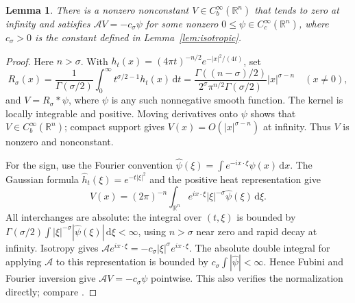 \documentclass[11pt]{article}
\newcommand{\R}{\mathbb R}
\newcommand{\dd}{\,\mathrm d}
\newcommand{\A}{\mathcal A}
\newcommand{\Cb}{C_b^\infty(\R^n)}
\newtheorem{lemma}[theorem]{Lemma}
\theoremstyle{remark}
\numberwithin{equation}{section}
\begin{document}
\begin{lemma}\label{lem:potential}
There is a nonzero nonconstant $V\in\Cb$ that tends to zero at infinity
and satisfies $\A V=-c_\sigma\psi$ for some nonzero
$0\le\psi\in C_c^\infty(\R^n)$, where $c_\sigma>0$ is the constant
defined in Lemma~\ref{lem:isotropic}.
\end{lemma}
\begin{proof}
Here $n>\sigma$. With $h_t(x)=(4\pi t)^{-n/2}e^{-|x|^2/(4t)}$, set
\[
 R_\sigma(x)=\frac1{\Gamma(\sigma/2)}\int_0^\infty
                 t^{\sigma/2-1}h_t(x)\dd t
 =\frac{\Gamma((n-\sigma)/2)}{2^\sigma\pi^{n/2}\Gamma(\sigma/2)}
                 |x|^{\sigma-n}\quad(x\ne0),
\]
and $V=R_\sigma*\psi$, where $\psi$ is any such nonnegative smooth function.
The kernel is locally integrable and positive. Moving derivatives onto
$\psi$ shows that $V\in\Cb$; compact support gives
$V(x)=O(|x|^{\sigma-n})$ at infinity. Thus $V$ is nonzero and nonconstant.

For the sign, use the Fourier convention
$\widehat\psi(\xi)=\int e^{-ix\cdot\xi}\psi(x)\dd x$.
The Gaussian formula $\widehat h_t(\xi)=e^{-t|\xi|^2}$ and the positive
heat representation give
\[
 V(x)=(2\pi)^{-n}\int_{\R^n}e^{ix\cdot\xi}|\xi|^{-\sigma}
                                  \widehat\psi(\xi)\dd\xi.
\]
All interchanges are absolute: the integral over $(t,\xi)$ is bounded by
$\Gamma(\sigma/2)\int |\xi|^{-\sigma}|\widehat\psi(\xi)|\dd\xi<\infty$,
using $n>\sigma$ near zero and rapid decay at infinity. Isotropy gives
$\A e^{ix\cdot\xi}=-c_\sigma|\xi|^\sigma e^{ix\cdot\xi}$.
The absolute double integral for applying $\A$ to this representation is
bounded by $c_\sigma\int|\widehat\psi|<\infty$. Hence Fubini and Fourier
inversion give $\A V=-c_\sigma\psi$ pointwise. This also verifies the
normalization directly; compare \cite[Definition 2.12]{Kwasnicki}.
\end{proof}
\end{document}

